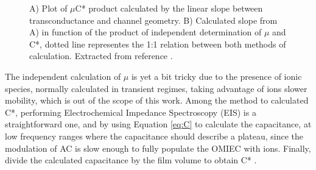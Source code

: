  \begin{figure}[h]
 	\centering
 	\hspace{2em}
 	\caption[OECTs benchmark with different OMIECs]{A) Plot of $\mu$C* product calculated by the linear slope between transconductance and channel geometry. B) Calculated slope from A) in function of the product of independent determination of $\mu$ and C*, dotted line representes the 1:1 relation between both methods of calculation. Extracted from reference %
 		\cite{inalBenchmarkingOrganicMixed2017}.}
 	\label{fig:gmuc}
 \end{figure}

The independent calculation of $\mu$ is yet a bit tricky due to the presence of ionic species, normally calculated in transient regimes, taking advantage of ions slower mobility, which is out of the scope of this work. Among the method to calculated C*, performing Electrochemical Impedance Spectroscopy (EIS) is a straightforward one, and by using Equation \ref{eq:C} to calculate the capacitance, at low frequency ranges where the capacitance should describe a plateau, since the modulation of AC is slow enough to fully populate the OMIEC with ions. Finally, divide the calculated capacitance by the film volume to obtain C*%
 \cite{ohayonGuideCharacterizationOrganic2023}.

